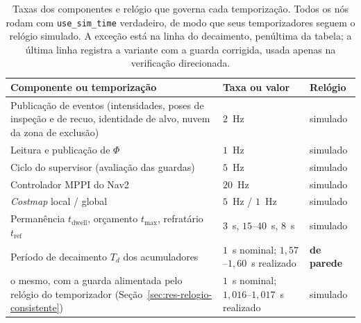 \begin{table}[htb]
\centering
\caption{Taxas dos componentes e relógio que governa cada temporização. Todos os nós
rodam com \texttt{use\_sim\_time} verdadeiro, de modo que seus temporizadores seguem o
relógio simulado. A exceção está na linha do decaimento, penúltima da tabela; a última linha registra a variante com a guarda corrigida, usada apenas na verificação direcionada.}
\label{tab:prop-taxas}
\footnotesize
\begin{tabular}{p{}p{}p{}}
\hline
\textbf{Componente ou temporização} & \textbf{Taxa ou valor} & \textbf{Relógio}\\
\hline
Publicação de eventos (intensidades, poses de inspeção e de recuo, identidade de alvo,
nuvem da zona de exclusão) & $2$~Hz & simulado\\
\hline
Leitura e publicação de $\Phi$ & $1$~Hz & simulado\\
\hline
Ciclo do supervisor (avaliação das guardas) & $5$~Hz & simulado\\
\hline
Controlador MPPI do Nav2 & $20$~Hz & simulado\\
\hline
\textit{Costmap} local / global & $5$~Hz / $1$~Hz & simulado\\
\hline
Permanência $t_{\text{dwell}}$, orçamento $t_{\max}$, refratário $t_{\text{ref}}$ &
$3$~s, $15$--$40$~s, $8$~s & simulado\\
\hline
Período de decaimento $T_d$ dos acumuladores & $1$~s nominal;
$1{,}57$--$1{,}60$~s realizado & \textbf{de parede}\\
\hline
\quad o mesmo, com a guarda alimentada pelo relógio do temporizador
(Seção~\ref{sec:res-relogio-consistente}) & $1$~s nominal; $1{,}016$--$1{,}017$~s
realizado &
simulado\\
\hline
\end{tabular}
\end{table}

